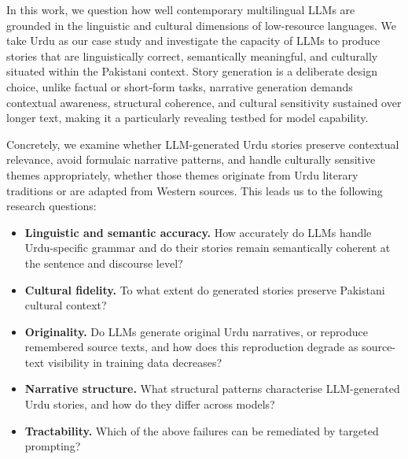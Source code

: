 \documentclass[11pt]{article}
\begin{document}
In this work, we question how well contemporary multilingual LLMs are grounded in the linguistic and cultural dimensions of low-resource languages. We take Urdu as our case study and investigate the capacity of LLMs to produce stories that are linguistically correct, semantically meaningful, and culturally situated within the Pakistani context. Story generation is a deliberate design choice, unlike factual or short-form tasks, narrative generation demands contextual awareness, structural coherence, and cultural sensitivity sustained over longer text, making it a particularly revealing testbed for model capability.

Concretely, we examine whether LLM-generated Urdu stories preserve contextual relevance, avoid formulaic narrative patterns, and handle culturally sensitive themes appropriately, whether those themes originate from Urdu literary traditions or are adapted from Western sources. This leads us to the following research questions:

\begin{itemize}

\item \textbf{Linguistic and semantic accuracy.} How accurately do LLMs handle Urdu-specific grammar and do their stories remain semantically coherent at the sentence and discourse level?
\item \textbf{Cultural fidelity.} To what extent do generated stories preserve Pakistani cultural context?
\item \textbf{Originality.} Do LLMs generate original Urdu narratives, or reproduce remembered source texts, and how does this reproduction degrade as source-text visibility in training data decreases?
\item \textbf{Narrative structure.} What structural patterns  characterise LLM-generated Urdu stories, and how do they differ across models?
\item \textbf{Tractability.} Which of the above failures can be remediated by targeted prompting?
\end{itemize}
\end{document}

